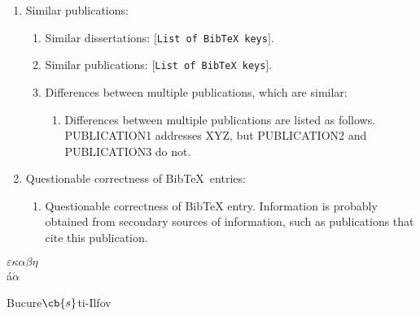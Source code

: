 \documentclass[letter,12pt]{article}
\begin{document}
\begin{enumerate}
\begin{enumerate}
	\end{enumerate}
\item Similar publications: \vspace{-0.3cm}
	\begin{enumerate} \itemsep -2pt
	\item Similar dissertations: $[${\tt List of {\rm {\sc Bib}\TeX}\ keys}$]$.
	\item Similar publications: $[${\tt List of {\rm {\sc Bib}\TeX}\ keys}$]$.
	\item Differences between multiple publications, which are similar: \vspace{-0.2cm}
		\begin{enumerate} \itemsep -2pt
		\item Differences between multiple publications are listed as follows. PUBLICATION1 addresses XYZ, but PUBLICATION2 and PUBLICATION3 do not.
		\end{enumerate}
	\end{enumerate}
\item Questionable correctness of {\sc Bib}\TeX\ entries: \vspace{-0.3cm}
	\begin{enumerate} \itemsep -2pt
	\item Questionable correctness of BibTeX entry. Information is probably obtained from secondary sources of information, such as publications that cite this publication.
	\end{enumerate}
\end{enumerate}







$\varepsilon\kappa\alpha\beta\eta$ \\
{\'{a}}$\acute{\alpha}$


Bucure$\cb{s}$ti-Ilfov


%	
\end{document}
